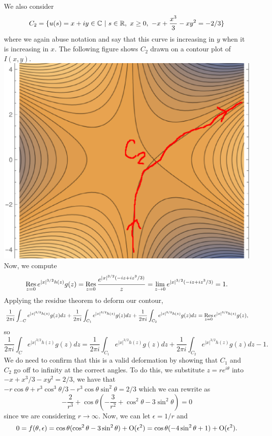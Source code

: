 \documentclass{article}
\begin{document}
We also consider
\[
C_2=\{u(s)=x+iy\in\mathbb{C} ~|~s\in\mathbb{R},~ x\geq0, ~ -x+\frac{x^3}{3}-xy^2=-2/3\}
\]
where we again abuse notation and say that this curve is increasing in $y$ when it is increasing in $x$. The following figure shows $C_2$ drawn on a contour plot of $I(x,y)$.\\
\includegraphics[scale=0.4]{568hw4fig3.eps}\\
Now, we compute 
\[
\operatorname*{Res}_{z=0}e^{|x|^{3/2}h(z)}g(z)=\operatorname*{Res}_{z=0}\frac{e^{|x|^{3/2}(-iz+iz^3/3)}}{z}=\lim_{z\to0}e^{|x|^{3/2}(-iz+iz^3/3)}=1.
\]
Applying the residue theorem to deform our contour, 
\[
\frac{1}{2 \pi i} \int_{-C} e^{|x|^{3/2}h(z)}g(z)dz+\frac{1}{2 \pi i} \int_{C_1} e^{|x|^{3/2}h(z)}g(z)dz+\frac{1}{2 \pi i} \int_{C_2} e^{|x|^{3/2}h(z)}g(z)dz=\operatorname*{Res}_{z=0}e^{|x|^{3/2}h(z)}g(z),
\]
so
\[
\frac{1}{2 \pi i} \int_{C} e^{|x|^{3/2}h(z)}g(z)dz=\frac{1}{2 \pi i} \int_{C_1} e^{|x|^{3/2}h(z)}g(z)dz+\frac{1}{2 \pi i} \int_{C_2} e^{|x|^{3/2}h(z)}g(z)dz-1.
\]
We do need to confirm that this is a valid deformation by showing that $C_1$ and $C_2$ go off to infinity at the correct angles. To do this, we substitute $z=re^{i\theta}$ into $-x+x^3/3-xy^2=2/3$, we have that $-r\cos\theta+r^3\cos^3\theta/3-r^3\cos\theta\sin^2\theta=2/3$ which we can rewrite as 
\[
-\frac{2}{r^3}+\cos\theta\left(-\frac{3}{r^2}+\cos^2\theta-3\sin^2\theta\right)=0
\]
since we are considering $r\to\infty$. Now, we can let $\epsilon=1/r$ and 
\[
0=f(\theta,\epsilon)=\cos\theta(\cos^2\theta-3\sin^2\theta)+\operatorname{O}(\epsilon^2)=\cos\theta(-4\sin^2\theta+1)+\operatorname{O}(\epsilon^2).
\]
\end{document}
